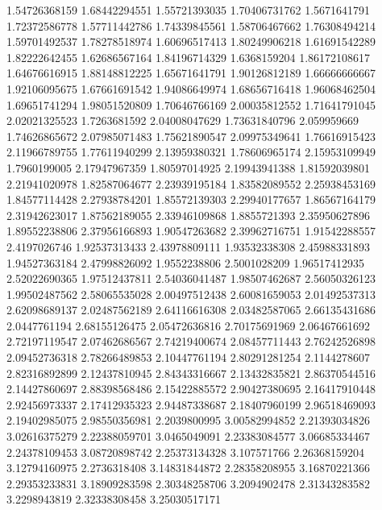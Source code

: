   1.54726368159    1.68442294551
  1.55721393035    1.70406731762
   1.5671641791    1.72372586778
  1.57711442786    1.74339845561
  1.58706467662    1.76308494214
  1.59701492537    1.78278518974
  1.60696517413    1.80249906218
  1.61691542289    1.82222642455
  1.62686567164    1.84196714329
   1.6368159204    1.86172108617
  1.64676616915    1.88148812225
  1.65671641791    1.90126812189
  1.66666666667    1.92106095675
  1.67661691542    1.94086649974
  1.68656716418    1.96068462504
  1.69651741294    1.98051520809
  1.70646766169    2.00035812552
  1.71641791045    2.02021325523
   1.7263681592    2.04008047629
  1.73631840796      2.059959669
  1.74626865672    2.07985071483
  1.75621890547    2.09975349641
  1.76616915423    2.11966789755
  1.77611940299    2.13959380321
  1.78606965174    2.15953109949
   1.7960199005    2.17947967359
  1.80597014925    2.19943941388
  1.81592039801    2.21941020978
  1.82587064677    2.23939195184
  1.83582089552    2.25938453169
  1.84577114428    2.27938784201
  1.85572139303    2.29940177657
  1.86567164179    2.31942623017
  1.87562189055    2.33946109868
   1.8855721393    2.35950627896
  1.89552238806    2.37956166893
  1.90547263682    2.39962716751
  1.91542288557     2.4197026746
  1.92537313433    2.43978809111
  1.93532338308    2.45988331893
  1.94527363184    2.47998826092
   1.9552238806     2.5001028209
  1.96517412935    2.52022690365
  1.97512437811    2.54036041487
  1.98507462687    2.56050326123
  1.99502487562    2.58065535028
  2.00497512438    2.60081659053
  2.01492537313    2.62098689137
  2.02487562189    2.64116616308
  2.03482587065    2.66135431686
   2.0447761194    2.68155126475
  2.05472636816    2.70175691969
  2.06467661692    2.72197119547
  2.07462686567    2.74219400674
  2.08457711443    2.76242526898
  2.09452736318    2.78266489853
  2.10447761194    2.80291281254
   2.1144278607    2.82316892899
  2.12437810945    2.84343316667
  2.13432835821    2.86370544516
  2.14427860697    2.88398568486
  2.15422885572    2.90427380695
  2.16417910448    2.92456973337
  2.17412935323    2.94487338687
  2.18407960199    2.96518469093
  2.19402985075    2.98550356981
   2.2039800995    3.00582994852
  2.21393034826    3.02616375279
  2.22388059701     3.0465049091
  2.23383084577    3.06685334467
  2.24378109453    3.08720898742
  2.25373134328      3.107571766
  2.26368159204    3.12794160975
   2.2736318408    3.14831844872
  2.28358208955    3.16870221366
  2.29353233831    3.18909283598
  2.30348258706     3.2094902478
  2.31343283582     3.2298943819
  2.32338308458    3.25030517171
